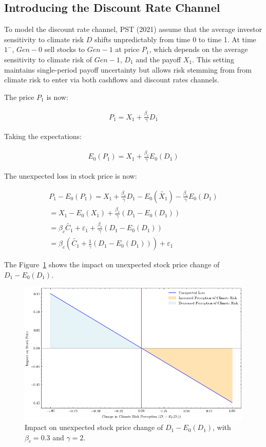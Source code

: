 \subsection{Introducing the Discount Rate Channel}

To model the discount rate channel, PST (2021)
assume that the average investor sensitivity to climate risk 
$D$ shifts unpredictably from time 0 
to time 1. 
At time $1^{-}$, $Gen-0$ sell stocks 
to $Gen-1$ at price $P_1$, which depends 
on the average sensitivity to climate risk
of $Gen-1$, $D_1$ and the payoff $X_1$.
This setting maintains single-period 
payoff uncertainty but allows risk
stemming from from climate risk to enter 
via both cashflows and discount rates 
channels.

The price $P_1$ is now:

\begin{equation}
    \begin{aligned}
    P_1 = X_1 + \frac{\beta_{c}}{\gamma}D_1
    \end{aligned}
\end{equation}

Taking the expectations:

\begin{equation}
    \begin{aligned}
    E_0(P_1) = X_1 + \frac{\beta_{c}}{\gamma}E_0(D_1) 
    \end{aligned}
\end{equation}

The unexpected loss in stock price is now:

\begin{equation}
    \begin{aligned}
    P_1 - E_0(P_1) = X_1 + \frac{\beta_{c}}{\gamma}D_1 - E_0(\tilde{X_1}) - \frac{\beta_{c}}{\gamma}E_0(D_1) \\
    = X_1 - E_0(X_1) + \frac{\beta_{c}}{\gamma}(D_1 - E_0(D_1)) \\
    = \beta_{c} \tilde{C_1} + \varepsilon_1 + \frac{\beta_{c}}{\gamma}(D_1 - E_0(D_1)) \\
    = \beta_{c}(\tilde{C_1} + \frac{1}{\gamma}(D_1 - E_0(D_1))) + \varepsilon_1
    \end{aligned}
\end{equation}

The Figure~\ref{fig:price_discount_rate} shows the 
impact on unexpected
stock price change of $D_1 - E_0(D_1)$.

\begin{figure}
    \includegraphics[width=\textwidth]{../images/chapter02/discount_price.png}
    \caption{Impact on unexpected 
    stock price change of $D_1 - E_0(D_1)$, with 
    $\beta_c = 0.3$ and $\gamma = 2$.}
    \label{fig:price_discount_rate}
\end{figure}